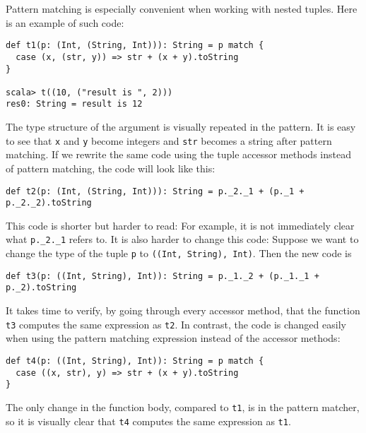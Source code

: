Pattern matching is especially convenient when working with nested
tuples. Here is an example of such code:
\begin{lstlisting}
def t1(p: (Int, (String, Int))): String = p match {
  case (x, (str, y)) => str + (x + y).toString
}

scala> t((10, ("result is ", 2)))
res0: String = result is 12
\end{lstlisting}
The type structure of the argument is visually repeated in the pattern.
It is easy to see that \lstinline!x!
and \lstinline!y! become
integers and \lstinline!str!
becomes a string after pattern matching. If we rewrite the same code
using the tuple accessor methods instead of pattern matching, the
code will look like this:
\begin{lstlisting}
def t2(p: (Int, (String, Int))): String = p._2._1 + (p._1 + p._2._2).toString
\end{lstlisting}
This code is shorter but harder to read: For example, it is not immediately
clear what \lstinline!p._2._1!
refers to. It is also harder to change this code: Suppose we want
to change the type of the tuple \lstinline!p!
to \lstinline!((Int, String), Int)!.
Then the new code is
\begin{lstlisting}
def t3(p: ((Int, String), Int)): String = p._1._2 + (p._1._1 + p._2).toString
\end{lstlisting}
It takes time to verify, by going through every accessor method, that
the function \lstinline!t3!
computes the same expression as \lstinline!t2!.
In contrast, the code is changed easily when using the pattern matching
expression instead of the accessor methods:
\begin{lstlisting}
def t4(p: ((Int, String), Int)): String = p match {
  case ((x, str), y) => str + (x + y).toString
}
\end{lstlisting}
The only change in the function body, compared to \lstinline!t1!,
is in the pattern matcher, so it is visually clear that \lstinline!t4!
computes the same expression as \lstinline!t1!.

